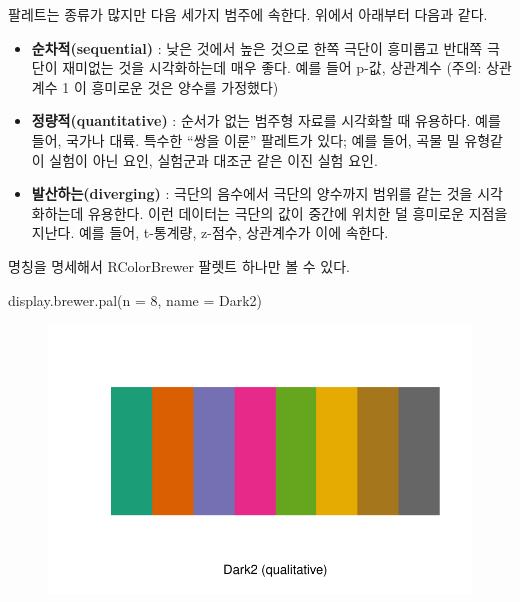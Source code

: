 \documentclass[
  letterpaper,
]{book}
\newenvironment{Shaded}{\begin{snugshade}}{\end{snugshade}}
\newcommand{\AttributeTok}[1]{\textcolor[rgb]{0.40,0.45,0.13}{#1}}
\newcommand{\DecValTok}[1]{\textcolor[rgb]{0.68,0.00,0.00}{#1}}
\newcommand{\FunctionTok}[1]{\textcolor[rgb]{0.28,0.35,0.67}{#1}}
\newcommand{\NormalTok}[1]{\textcolor[rgb]{0.00,0.23,0.31}{#1}}
\newcommand{\StringTok}[1]{\textcolor[rgb]{0.13,0.47,0.30}{#1}}
\providecommand{\tightlist}{%
  \setlength{\itemsep}{0pt}\setlength{\parskip}{0pt}}\usepackage{longtable,booktabs,array}
\begin{document}
팔레트는 종류가 많지만 다음 세가지 범주에 속한다. 위에서 아래부터 다음과
같다.

\begin{itemize}
\tightlist
\item
  \textbf{순차적(sequential)} : 낮은 것에서 높은 것으로 한쪽 극단이
  흥미롭고 반대쪽 극단이 재미없는 것을 시각화하는데 매우 좋다. 예를 들어
  p-값, 상관계수 (주의: 상관계수 1 이 흥미로운 것은 양수를 가정했다)
\item
  \textbf{정량적(quantitative)} : 순서가 없는 범주형 자료를 시각화할 때
  유용하다. 예를 들어, 국가나 대륙. 특수한 ``쌍을 이룬'' 팔레트가 있다;
  예를 들어, 곡물 밀 유형같이 실험이 아닌 요인, 실험군과 대조군 같은
  이진 실험 요인.
\item
  \textbf{발산하는(diverging)} : 극단의 음수에서 극단의 양수까지 범위를
  같는 것을 시각화하는데 유용한다. 이런 데이터는 극단의 값이 중간에
  위치한 덜 흥미로운 지점을 지난다. 예를 들어, t-통계량, z-점수,
  상관계수가 이에 속한다.
\end{itemize}

명칭을 명세해서 RColorBrewer 팔렛트 하나만 볼 수 있다.

\begin{Shaded}
\begin{Highlighting}[]
\FunctionTok{display.brewer.pal}\NormalTok{(}\AttributeTok{n =} \DecValTok{8}\NormalTok{, }\AttributeTok{name =} \StringTok{\textquotesingle{}Dark2\textquotesingle{}}\NormalTok{)}
\end{Highlighting}
\end{Shaded}

\begin{figure}[H]

{\centering \includegraphics{colors_files/figure-pdf/dataviz-brewer-palette-1.pdf}

}

\end{figure}
\end{document}
